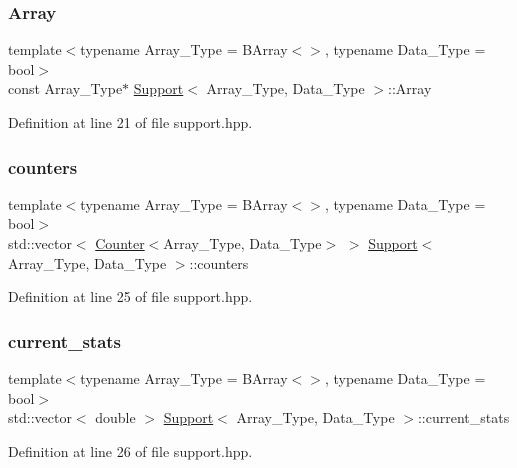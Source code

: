 \subsubsection{\texorpdfstring{Array}{Array}}
{\footnotesize\ttfamily template$<$typename Array\+\_\+\+Type  = B\+Array$<$$>$, typename Data\+\_\+\+Type  = bool$>$ \\
const Array\+\_\+\+Type$\ast$ \hyperlink{class_support}{Support}$<$ Array\+\_\+\+Type, Data\+\_\+\+Type $>$\+::Array}



Definition at line 21 of file support.\+hpp.

\mbox{\label{class_support_a04c684d0e662d58aad1c90b9c0a595b5}} 
\subsubsection{\texorpdfstring{counters}{counters}}
{\footnotesize\ttfamily template$<$typename Array\+\_\+\+Type  = B\+Array$<$$>$, typename Data\+\_\+\+Type  = bool$>$ \\
std\+::vector$<$ \hyperlink{class_counter}{Counter}$<$Array\+\_\+\+Type, Data\+\_\+\+Type$>$ $>$ \hyperlink{class_support}{Support}$<$ Array\+\_\+\+Type, Data\+\_\+\+Type $>$\+::counters}



Definition at line 25 of file support.\+hpp.

\mbox{\label{class_support_ada67557033378742f8592a96f39d1127}} 
\subsubsection{\texorpdfstring{current\+\_\+stats}{current\_stats}}
{\footnotesize\ttfamily template$<$typename Array\+\_\+\+Type  = B\+Array$<$$>$, typename Data\+\_\+\+Type  = bool$>$ \\
std\+::vector$<$ double $>$ \hyperlink{class_support}{Support}$<$ Array\+\_\+\+Type, Data\+\_\+\+Type $>$\+::current\+\_\+stats}



Definition at line 26 of file support.\+hpp.

\mbox{\label{class_support_ad185d111ea5ea3bfe16cf458a36efc63}} 
